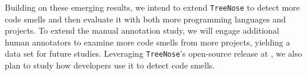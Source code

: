 
Building on these emerging results, we intend to extend \texttt{TreeNose} to
detect more code smells and then evaluate it with both more programming
languages and projects. To extend the manual annotation study, we will engage
additional human annotators to examine more code smells from more projects,
yielding a data set for future studies.
%
Leveraging \texttt{TreeNose}'s open-source release at \texttt{\GitHubLink{}},
we also plan to study how developers use it to detect code smells.
